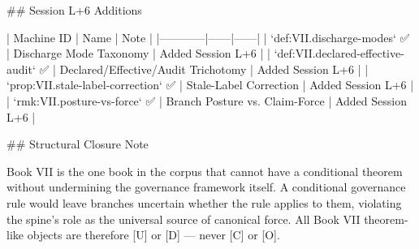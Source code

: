 ## Session L+6 Additions

| Machine ID | Name | Note |
|------------|------|------|
| `def:VII.discharge-modes` ✅ | Discharge Mode Taxonomy | Added Session L+6 |
| `def:VII.declared-effective-audit` ✅ | Declared/Effective/Audit Trichotomy | Added Session L+6 |
| `prop:VII.stale-label-correction` ✅ | Stale-Label Correction | Added Session L+6 |
| `rmk:VII.posture-vs-force` ✅ | Branch Posture vs. Claim-Force | Added Session L+6 |

## Structural Closure Note

\noindent Book VII is the one book in the corpus that cannot have a conditional theorem without undermining the governance framework itself. A conditional governance rule would leave branches uncertain whether the rule applies to them, violating the spine's role as the universal source of canonical force. All Book VII theorem-like objects are therefore [U] or [D] — never [C] or [O].

